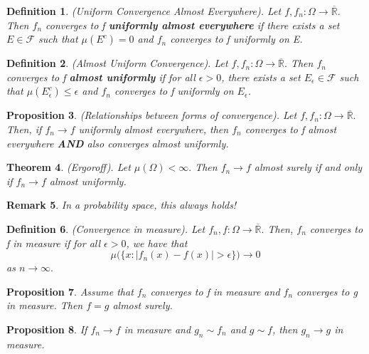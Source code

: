\documentclass[twoside]{article}
\newcounter{lecnum}
\newtheorem{theorem}{Theorem}[lecnum]
\newtheorem{proposition}[theorem]{Proposition}
\newtheorem{definition}[theorem]{Definition}
\newtheorem{remark}[theorem]{Remark}
\newcommand{\sigmalgebra}{\mathcal{F}}
\newcommand{\extendedreal}{\overline{\mathbb{R}}}
\begin{document}
\begin{definition}(Uniform Convergence Almost Everywhere). Let $f, f_n: \Omega \rightarrow \extendedreal$. Then $f_n$ converges to f \textbf{uniformly almost everywhere} if there exists a set $E \in \sigmalgebra$ such that $\mu (E^c) = 0$ and $f_n$ converges to f uniformly on E.
\end{definition}

\begin{definition}(Almost Uniform Convergence). Let $f, f_n: \Omega \rightarrow \extendedreal.$ Then $f_n$ converges to f \textbf{almost uniformly} if for all $\epsilon > 0$, there exists a set $E_{\epsilon} \in \sigmalgebra$ such that $\mu(E_{\epsilon}^c) \leq \epsilon$ and $f_n$ converges to f uniformly on $E_{\epsilon}$.
\end{definition}



\begin{proposition}(Relationships between forms of convergence). Let $f, f_n: \Omega \rightarrow \extendedreal.$ Then, if $f_n \rightarrow f$ uniformly almost everywhere, then $f_n$ converges to f almost everywhere \textbf{AND} also converges almost uniformly.
\end{proposition}

\begin{theorem}(Ergoroff). Let $\mu(\Omega) < \infty.$ Then $f_n \rightarrow f$ almost surely if and only if $f_n \rightarrow f$ almost uniformly.
\end{theorem}
\begin{remark}In a probability space, this always holds!
\end{remark}


\begin{definition}(Convergence in measure). Let $f_n, f: \Omega \rightarrow \extendedreal.$ Then, $f_n$ converges to f in measure if for all $\epsilon > 0$, we have that 
$$
\mu \bigg(\{x: |f_n(x) - f(x)| > \epsilon\} \bigg) \rightarrow 0
$$
as $n \rightarrow \infty.$
\end{definition}

\begin{proposition}Assume that $f_n$ converges to f in measure and $f_n$ converges to g in measure. Then $f = g$ almost surely.
\end{proposition}

\begin{proposition}If $f_n \rightarrow f$ in measure and $g_n \sim f_n$ and $g \sim f$, then $g_n \rightarrow g$ in measure.
\end{proposition}
\end{document}
